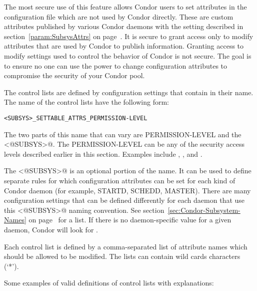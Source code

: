 The most secure use of this feature allows Condor users to set
attributes in the configuration file which are not used by Condor
directly.
These are custom attributes published by various Condor
daemons with the  setting described in
section~\ref{param:SubsysAttrs} on page~\pageref{param:SubsysAttrs}.
It is secure to grant access only to modify attributes that are used by Condor
to publish information.
Granting access to modify
settings used to control the behavior of Condor is
not secure.
The goal is to
ensure no
one can use the power to change configuration attributes to compromise 
the security of your Condor pool.

The control lists are defined by configuration settings that contain 
 in their name.
The name of the control lists have the following form: 

\footnotesize
\begin{verbatim}
<SUBSYS>_SETTABLE_ATTRS_PERMISSION-LEVEL
\end{verbatim}
\normalsize

The two parts of this name that can vary are
PERMISSION-LEVEL and the \verb@<@SUBSYS\verb@>@.
The PERMISSION-LEVEL can be any of the security access levels
described earlier in this section.
Examples include , , and .

The \verb@<@SUBSYS\verb@>@ is an optional portion of the name. 
It can be used to
define separate rules for which configuration attributes can be set
for each kind of Condor daemon (for example, STARTD, SCHEDD, MASTER).
There are many configuration settings that can be defined differently
for each daemon that use this \verb@<@SUBSYS\verb@>@ naming convention.
See section~\ref{sec:Condor-Subsystem-Names} on
page~\pageref{sec:Condor-Subsystem-Names} for a list.
If there is no daemon-specific value for a given daemon, Condor will
look for .

Each control list is defined by a comma-separated list of attribute
names which should be allowed to be modified.
The lists can contain wild cards characters (`*'). 

Some examples of valid definitions of control lists with explanations:

